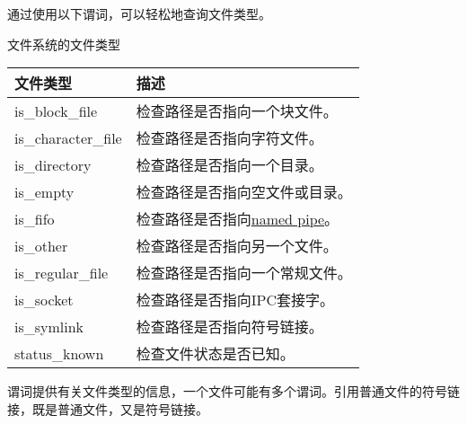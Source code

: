通过使用以下谓词，可以轻松地查询文件类型。

\begin{center}
文件系统的文件类型
\end{center}

\begin{longtable}[c]{|l|l|}
\hline
\textbf{文件类型} & \textbf{描述}                                      \\ \hline
\endfirsthead
%
\endhead
%
is\_block\_file     & 检查路径是否指向一个块文件。               \\ \hline
is\_character\_file & 检查路径是否指向字符文件。           \\ \hline
is\_directory       & 检查路径是否指向一个目录。                \\ \hline
is\_empty           & 检查路径是否指向空文件或目录。 \\ \hline
is\_fifo            & 检查路径是否指向\href{https://en.wikipedia.org/wiki/Named_pipe}{named pipe}。               \\ \hline
is\_other           & 检查路径是否指向另一个文件。               \\ \hline
is\_regular\_file   & 检查路径是否指向一个常规文件。             \\ \hline
is\_socket          & 检查路径是否指向IPC套接字。              \\ \hline
is\_symlink         & 检查路径是否指向符号链接。            \\ \hline
status\_known       & 检查文件状态是否已知。                      \\ \hline
\end{longtable}


谓词提供有关文件类型的信息，一个文件可能有多个谓词。引用普通文件的符号链接，既是普通文件，又是符号链接。



